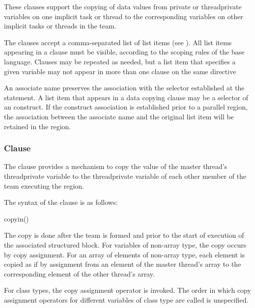 These clauses support the copying of data values from private or threadprivate variables 
on one implicit task or thread to the corresponding variables on other implicit tasks or 
threads in the team.

The clauses accept a comma-separated list of list items (see ). 
All list items appearing in a clause must be visible, according to the scoping rules of the 
base language. Clauses may be repeated as needed, but a list item that specifies a given 
variable may not appear in more than one clause on the same directive

\fortranspecificstart
An associate name preserves the association with the selector established at the  statement. A list item that appears in a data copying clause may be a selector of an  construct. If the construct association is established prior to a parallel region, the association between the associate name and the original list item will be retained in the region.
\fortranspecificend







\subsubsection{ Clause}
\label{subsubsec:copyin clause}
\summary
The  clause provides a mechanism to copy the value of the master thread’s 
threadprivate variable to the threadprivate variable of each other member of the team 
executing the  region. 

\syntax
The syntax of the  clause is as follows:

\begin{boxedcode}
copyin()
\end{boxedcode}

\descr
\ccppspecificstart
The copy is done after the team is formed and prior to the start of execution of the 
associated structured block. For variables of non-array type, the copy occurs by copy 
assignment. For an array of elements of non-array type, each element is copied as if by 
assignment from an element of the master thread’s array to the corresponding element of 
the other thread’s array. 
\ccppspecificend

\cppspecificstart
For class types, the copy assignment operator is invoked. The order in which copy 
assignment operators for different variables of class type are called is unspecified. 
\cppspecificend


